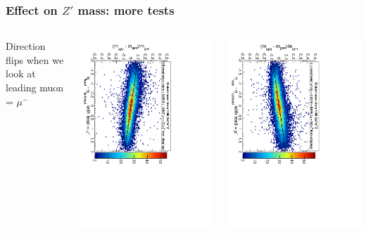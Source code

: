 \documentclass[compress]{beamer}
\begin{document}
\begin{frame}
\frametitle{Effect on $Z'$ mass: more tests}
\begin{columns}
Direction flips when we look at leading muon = $\mu^-$

\vspace{0.2 cm}
\includegraphics[height=0.95\linewidth, angle=90]{massbias_twist0_5mrad_1100_GlobalMuons2_plus.pdf}

\includegraphics[height=0.95\linewidth, angle=90]{massbias_twist0_5mrad_1100_GlobalMuons2_minus.pdf}


\end{columns}
\end{frame}
\end{document}
